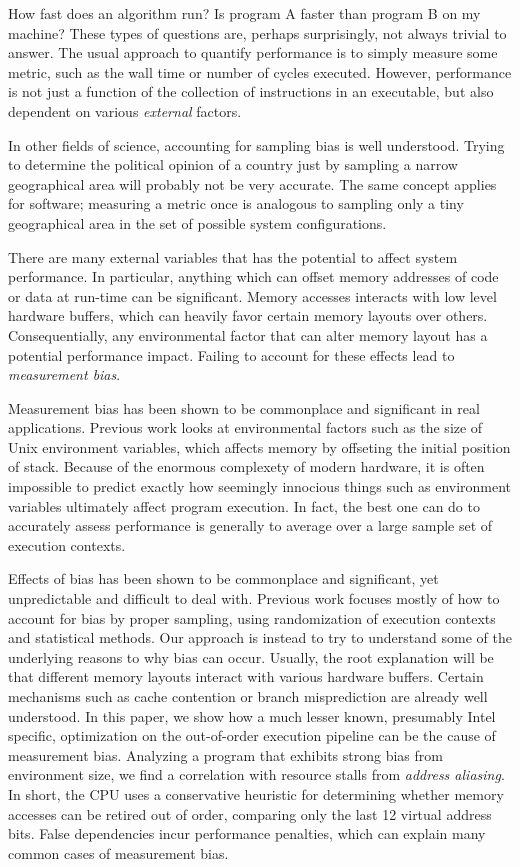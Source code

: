 \documentclass[a4paper,10pt,twocolumn,twoside]{article}
\begin{document}
How fast does an algorithm run?
Is program A faster than program B on my machine?
These types of questions are, perhaps surprisingly, not always trivial to answer.
The usual approach to quantify performance is to simply measure some metric, such as the wall time or number of cycles executed.
However, performance is not just a function of the collection of instructions in an executable, but also dependent on various \emph{external} factors.

In other fields of science, accounting for sampling bias is well understood.
Trying to determine the political opinion of a country just by sampling a narrow geographical area will probably not be very accurate.
The same concept applies for software; measuring a metric once is analogous to sampling only a tiny geographical area in the set of possible system configurations.

There are many external variables that has the potential to affect system performance.
In particular, anything which can offset memory addresses of code or data at run-time can be significant.
Memory accesses interacts with low level hardware buffers, which can heavily favor certain memory layouts over others.
Consequentially, any environmental factor that can alter memory layout has a potential performance impact.
Failing to account for these effects lead to \emph{measurement bias}. 

Measurement bias has been shown to be commonplace and significant in real applications.
Previous work looks at environmental factors such as the size of Unix environment variables, which affects memory by offseting the initial position of stack.
Because of the enormous complexety of modern hardware, it is often impossible to predict exactly how seemingly innocious things such as environment variables ultimately affect program execution.
In fact, the best one can do to accurately assess performance is generally to average over a large sample set of execution contexts. \cite{Mytkowicz:2008:OE&MB, Mytkowicz:2009:WrongData, Mytkowicz:2008:Easy}

Effects of bias has been shown to be commonplace and significant, yet unpredictable and difficult to deal with.
Previous work focuses mostly of how to account for bias by proper sampling, using randomization of execution contexts and statistical methods.
Our approach is instead to try to understand some of the underlying reasons to why bias can occur.
Usually, the root explanation will be that different memory layouts interact with various hardware buffers.
Certain mechanisms such as cache contention or branch misprediction are already well understood.
In this paper, we show how a much lesser known, presumably Intel specific, optimization on the out-of-order execution pipeline can be the cause of measurement bias.
Analyzing a program that exhibits strong bias from environment size, we find a correlation with resource stalls from \emph{address aliasing}.
In short, the CPU uses a conservative heuristic for determining whether memory accesses can be retired out of order, comparing only the last 12 virtual address bits.
False dependencies incur performance penalties, which can explain many common cases of measurement bias.
\end{document}
